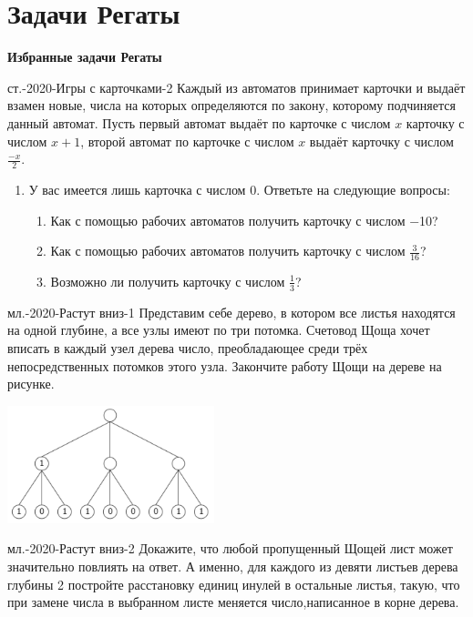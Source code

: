 \documentclass[11pt]{beamer}
\newcommand\fram[2]{\begin{frame}{\bf #1} #2 \end{frame}}
\def\usl#1#2{\begin{block}{#1} #2 \end{block} \medskip\pause}
\def\uslnp#1#2{\begin{block}{#1} #2 \end{block} \medskip}
\begin{document}
\section{Задачи Регаты}
\fram{Избранные задачи Регаты}{
\uslnp{ст.-2020-Игры с карточками-2}{
Каждый из автоматов принимает карточки и выдаёт взамен новые, числа на которых определяются по закону, которому подчиняется данный автомат. Пусть первый автомат выдаёт по карточке с числом $x$ карточку с числом $x+1$, второй автомат по карточке с числом $x$ выдаёт карточку с числом $\frac{-x}{2}$.
\begin{enumerate}
	\item У вас имеется лишь карточка с числом 0. Ответьте на следующие вопросы:
	\begin{enumerate}
		\item Как с помощью рабочих автоматов получить карточку с числом −10?
		\item Как с помощью рабочих автоматов получить карточку с числом $\frac{3}{16}$?
		\item Возможно ли получить карточку с числом $\frac{1}{3}$?
	\end{enumerate}
\end{enumerate}
}
}

\fram{}{
\usl{мл.-2020-Растут вниз-1}{
Представим себе дерево, в котором все листья находятся на одной глубине, а все узлы имеют по три потомка. Счетовод Щоща хочет вписать в каждый узел дерева число, преобладающее среди трёх непосредственных потомков этого узла. Закончите работу Щощи на дереве на рисунке.
}\vspace{-4mm}
\begin{center}
	\includegraphics[width=6cm]{tree-1}
\end{center}
}

\fram{}{
\uslnp{мл.-2020-Растут вниз-2}{
Докажите, что любой пропущенный Щощей лист может значительно повлиять на ответ. А именно, для каждого из девяти листьев дерева глубины 2 постройте расстановку единиц инулей в остальные листья, такую, что при замене числа в выбранном листе меняется число,написанное в корне дерева.
}
}
\end{document}
